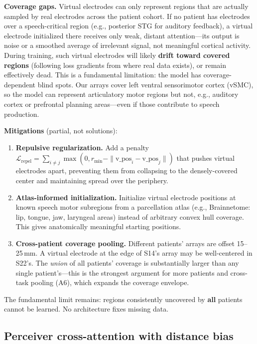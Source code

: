 \documentclass[11pt,letterpaper]{article}
\begin{document}
\textbf{Coverage gaps.} Virtual electrodes can only represent regions that are actually sampled by real electrodes across the patient cohort. If no patient has electrodes over a speech-critical region (e.g., posterior STG for auditory feedback), a virtual electrode initialized there receives only weak, distant attention---its output is noise or a smoothed average of irrelevant signal, not meaningful cortical activity. During training, such virtual electrodes will likely \textbf{drift toward covered regions} (following loss gradients from where real data exists), or remain effectively dead. This is a fundamental limitation: the model has coverage-dependent blind spots. Our arrays cover left ventral sensorimotor cortex (vSMC), so the model can represent articulatory motor regions but not, e.g., auditory cortex or prefrontal planning areas---even if those contribute to speech production.

\textbf{Mitigations} (partial, not solutions):
\begin{enumerate}[leftmargin=2em]
\item \textbf{Repulsive regularization.} Add a penalty $\mathcal{L}_{\text{repel}} = \sum_{i \neq j} \max(0, r_{\min} - \|\text{v\_pos}_i - \text{v\_pos}_j\|)$ that pushes virtual electrodes apart, preventing them from collapsing to the densely-covered center and maintaining spread over the periphery.
\item \textbf{Atlas-informed initialization.} Initialize virtual electrode positions at known speech motor subregions from a parcellation atlas (e.g., Brainnetome: lip, tongue, jaw, laryngeal areas) instead of arbitrary convex hull coverage. This gives anatomically meaningful starting positions.
\item \textbf{Cross-patient coverage pooling.} Different patients' arrays are offset 15--25\,mm. A virtual electrode at the edge of S14's array may be well-centered in S22's. The \emph{union} of all patients' coverage is substantially larger than any single patient's---this is the strongest argument for more patients and cross-task pooling (A6), which expands the coverage envelope.
\end{enumerate}
The fundamental limit remains: regions consistently uncovered by \textbf{all} patients cannot be learned. No architecture fixes missing data.

\subsection{Perceiver cross-attention with distance bias}
\end{document}
